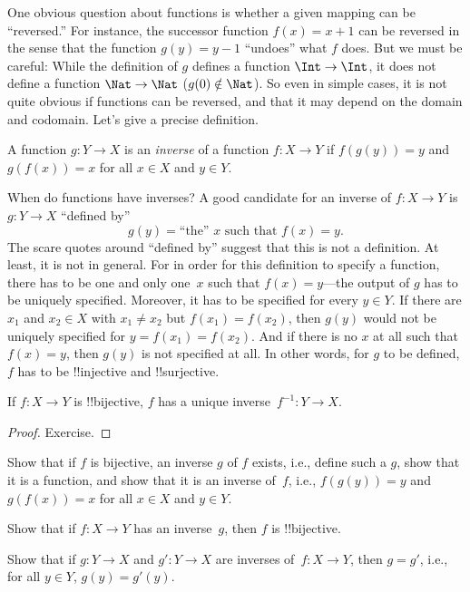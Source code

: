 \documentclass[../../../include/open-logic-section]{subfiles}
\begin{document}

\begin{explain}
One obvious question about functions is whether a given mapping can be
``reversed.'' For instance, the successor function $f(x) = x + 1$ can
be reversed in the sense that the function $g(y) = y - 1$ ``undoes''
what $f$ does. But we must be careful: While the definition of $g$
defines a function $\Int \to \Int$, it does not define a function
$\Nat \to \Nat$ ($g(0) \notin \Nat$).  So even in simple cases, it is
not quite obvious if functions can be reversed, and that it may depend
on the domain and codomain.  Let's give a precise definition.
\end{explain}

\begin{defn}
A function $g \colon Y \to X$ is an \emph{inverse} of a function $f
\colon X \to Y$ if $f(g(y)) = y$ and $g(f(x)) = x$ for all $x \in X$
and $y \in Y$.
\end{defn}

\begin{explain}
When do functions have inverses?  A good candidate for an inverse of
$f\colon X \to Y$ is $g\colon Y \to X$ ``defined by''
\[
g(y) = \text{``the'' $x$ such that $f(x) = y$.}
\]
The scare quotes around ``defined by'' suggest that this is not a
definition.  At least, it is not in general.  For in order for this
definition to specify a function, there has to be one and only one~$x$
such that $f(x) = y$---the output of $g$ has to be uniquely specified.
Moreover, it has to be specified for every $y \in Y$.  If there are
$x_1$ and $x_2 \in X$ with $x_1 \neq x_2$ but $f(x_1) = f(x_2)$, then
$g(y)$ would not be uniquely specified for $y = f(x_1) = f(x_2)$. And
if there is no $x$ at all such that $f(x) = y$, then $g(y)$ is not
specified at all.  In other words, for $g$ to be defined, $f$ has to
be !!{injective} and !!{surjective}.
\end{explain}

\begin{prop}
If $f\colon X \to Y$ is !!{bijective}, $f$ has a unique
inverse~$f^{-1}\colon Y \to X$.
\end{prop}

\begin{proof}
Exercise.
\end{proof}

\begin{prob}
Show that if $f$ is bijective, an inverse $g$ of $f$ exists, i.e.,
define such a $g$, show that it is a function, and show that it is an
inverse of~$f$, i.e., $f(g(y)) = y$ and $g(f(x)) = x$ for all $x \in
X$ and $y \in Y$.
\end{prob}

\begin{prob}
Show that if $f\colon X \to Y$ has an inverse~$g$, then $f$ is
!!{bijective}.
\end{prob}

\begin{prob}
Show that if $g\colon Y \to X$ and $g'\colon Y \to X$ are inverses
of~$f\colon X \to Y$, then $g = g'$, i.e., for all $y \in Y$, $g(y) =
g'(y)$.
\end{prob}
\end{document}
